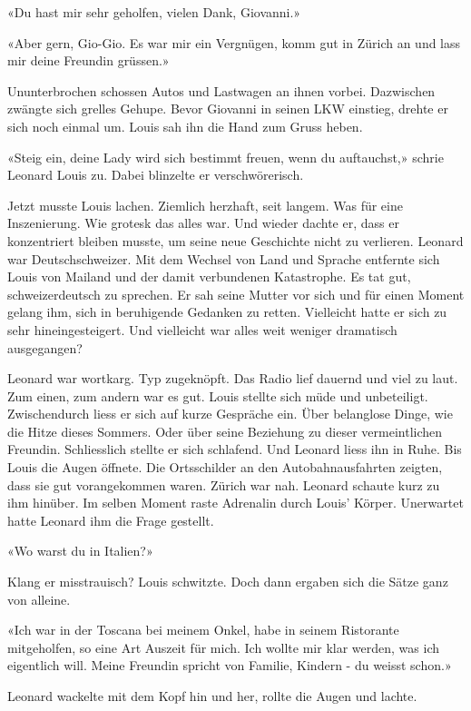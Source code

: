 «Du hast mir sehr geholfen, vielen Dank, Giovanni.»

«Aber gern, Gio-Gio. Es war mir ein Vergnügen, komm gut in Zürich an und lass mir deine Freundin grüssen.»

Ununterbrochen schossen Autos und Lastwagen an ihnen vorbei. Dazwischen zwängte sich grelles Gehupe.
Bevor Giovanni in seinen LKW einstieg, drehte er sich noch einmal um. Louis sah ihn die Hand zum Gruss heben.

«Steig ein, deine Lady wird sich bestimmt freuen, wenn du auftauchst,»
schrie Leonard Louis zu. Dabei blinzelte er verschwörerisch. 

Jetzt musste Louis lachen. Ziemlich herzhaft, seit langem. Was für eine
Inszenierung. Wie grotesk das alles war.
Und wieder dachte er, dass er konzentriert bleiben musste, um seine neue Geschichte nicht zu verlieren.
Leonard war Deutschschweizer. Mit dem Wechsel von Land und Sprache entfernte sich Louis von Mailand
und der damit verbundenen Katastrophe.
Es tat gut, schweizerdeutsch zu sprechen. Er sah seine Mutter vor sich und  
für einen Moment gelang ihm, sich in beruhigende Gedanken zu retten. Vielleicht hatte er sich zu sehr hineingesteigert. Und vielleicht war alles weit weniger dramatisch ausgegangen?

Leonard war wortkarg. Typ zugeknöpft. Das Radio lief dauernd und viel zu
laut. Zum einen, zum andern war es gut. Louis stellte sich müde und
unbeteiligt. Zwischendurch liess er sich auf kurze Gespräche ein. Über
belanglose Dinge, wie die Hitze dieses Sommers. Oder über seine
Beziehung zu dieser vermeintlichen Freundin. Schliesslich stellte er sich
schlafend. Und Leonard liess ihn in Ruhe.
Bis Louis die Augen öffnete. Die Ortsschilder an den Autobahnausfahrten
zeigten, dass sie gut vorangekommen waren. Zürich war nah. Leonard
schaute kurz zu ihm hinüber.
Im selben Moment raste Adrenalin durch Louis’ Körper. Unerwartet hatte
Leonard ihm die Frage gestellt.

«Wo warst du in Italien?»

Klang er misstrauisch? Louis schwitzte. Doch dann ergaben sich die
Sätze ganz von alleine.

«Ich war in der Toscana bei meinem Onkel, habe in seinem Ristorante
mitgeholfen, so eine Art Auszeit für mich. Ich wollte mir klar werden, was
ich eigentlich will. Meine Freundin spricht von Familie, Kindern - du
weisst schon.»

Leonard wackelte mit dem Kopf hin und her, rollte die Augen und lachte.

